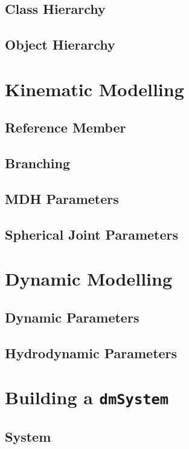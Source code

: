 \documentclass[11pt]{article}
\begin{document}
\subsection{Class Hierarchy}
\subsection{Object Hierarchy}


\section{Kinematic Modelling}
\subsection{Reference Member}
\subsection{Branching}
\subsection{MDH Parameters}
\subsection{Spherical Joint Parameters}


\section{Dynamic Modelling}
\subsection{Dynamic Parameters}
\subsection{Hydrodynamic Parameters}


\section{Building a {\tt dmSystem}}
\subsection{System}
\end{document}
